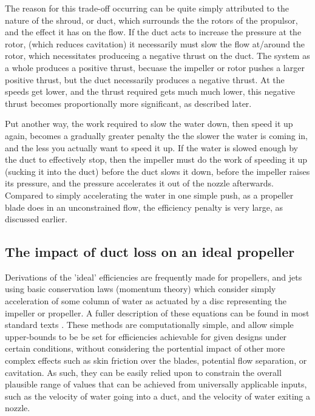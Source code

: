 \documentclass{article}\usepackage[]{graphicx}\usepackage[]{color}
\begin{document}
The reason for this trade-off occurring can be quite simply attributed to the nature of the shroud, or duct, which surrounds the the rotors of the propulsor, and the effect it has on the flow. If the duct acts to increase the pressure at the rotor, (which reduces cavitation) it necessarily must slow the flow at/around the rotor, which necessitates produceing a negative thrust on the duct.  The system as a whole produces a positive thrust, becuase the impeller or rotor pushes a larger positive thrust, but the duct necessarily produces a negative thrust.  At the speeds get lower, and the thrust required gets much much lower, this negative thrust becomes proportionally more significant, as described later.

Put another way, the work required to slow the water down, then speed it up again, becomes a gradually greater penalty the the slower the water is coming in, and the less you actually want to speed it up.  If the water is slowed enough by the duct to effectively stop, then the impeller must do the work of speeding it up (sucking it into the duct) before the duct slows it down, before the impeller raises its pressure, and the pressure accelerates it out of the nozzle afterwards. Compared to simply accelerating the water in one simple push, as a propeller blade does in an unconstrained flow, the efficiency penalty is very large, as discussed earlier.

\subsection{The impact of duct loss on an ideal propeller}

Derivations of the 'ideal' efficiencies are frequently made for propellers, and jets using basic conservation laws (momentum theory) which consider simply acceleration of some column of water as actuated by a disc representing the impeller or propeller.  A fuller description of these equations can be found in  most standard texts \parencite[131]{lewis1988}. These methods are computationally simple, and allow simple upper-bounds to be be set for efficiencies achievable for given designs under certain conditions, without considering the portential impact of other more complex effects such as skin friction over the blades, potential flow separation, or cavitation.  As such, they can be easily relied upon to constrain the overall plausible range of values that can be achieved from universally applicable inputs, such as the velocity of water going into a duct, and the velocity of water exiting a nozzle.
\end{document}
